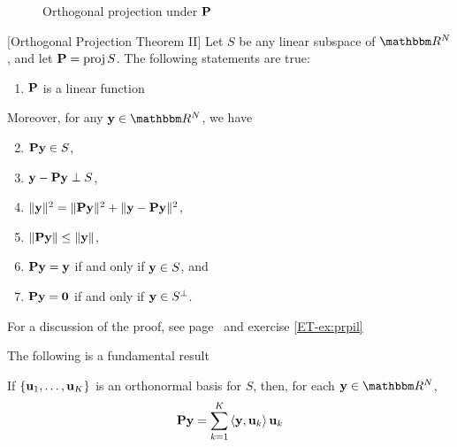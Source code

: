 \begin{frame}

     \vspace{2em}
    \begin{figure}
       \begin{center}
        
        \caption{\label{f:orth_proj2Dp} Orthogonal projection under $\mathbf P$}
       \end{center}
    \end{figure}
    
\end{frame}

\begin{frame}

    \vspace{2em}
    \Thm{\eqref{ET-t:opt2}}
    [Orthogonal Projection Theorem II]
    Let $S$ be any linear subspace of $\RR^N$, and let $\mathbf P = \operatorname{proj} S$.
    The following statements are true:
    \begin{enumerate}
        \item $\mathbf P$ is a linear function
    \end{enumerate}
    Moreover, for any $\boldy \in \RR^N$, we have
    \begin{enumerate}
        \setcounter{enumi}{1}
        \item $\mathbf P {\mathbf y} \in S$,
        \item ${\mathbf y} - \mathbf P {\mathbf y} \perp S$,
        \item $\| {\mathbf y} \|^2 = \| \mathbf P {\mathbf y} \|^2 + \| {\mathbf y} - \mathbf P
            {\mathbf y} \|^2$,
        \item $\| \mathbf P {\mathbf y} \| \leq \| {\mathbf y} \|$,
        \item $\mathbf P {\mathbf y} = {\mathbf y}$ if and only if ${\mathbf y} \in S$, and
        \item $\mathbf P {\mathbf y} = {\mathbf 0}$ if and only if ${\mathbf y} \in
            S^{\perp}$.
    \end{enumerate}
    For a discussion of the proof, see page~\pageref{ET-t:opt2} and
     exercise \ref{ET-ex:prpil}
    
\end{frame}

\begin{frame}

     \vspace{2em}
    The following is a fundamental result 
    
    \vspace{.7em}
    \Fact{\eqref{ET-fa:projon}}
    If $\{{\mathbf u}_1, \ldots, {\mathbf u}_K\}$ is an orthonormal basis for $S$, then,
    for each $\boldy \in \RR^N$,
    \begin{equation}
        \label{eq:projon}
        \mathbf P {\mathbf y} = \sum_{k=1}^K \left\langle{ {\mathbf y} ,  {\mathbf u} _k}\right\rangle {\mathbf u}_k
    \end{equation}
\end{frame}

